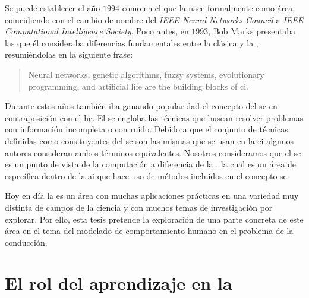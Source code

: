 Se puede establecer el año $1994$ como en el que la  nace formalmente como área, coincidiendo con el cambio de nombre del \textit{IEEE Neural Networks Council} a \textit{IEEE Computational Intelligence Society}. Poco antes, en $1993$, Bob Marks presentaba las que él consideraba diferencias fundamentales entre la  clásica y la , resumiéndolas en la siguiente frase:

\blockquote{Neural networks, genetic algorithms, fuzzy systems, evolutionary programming, and artificial life are the building blocks of \acrlong{ci}.}

Durante estos años también iba ganando popularidad el concepto del \gls{sc} en contraposición con el \gls{hc}. El \gls{sc} engloba las técnicas que buscan resolver problemas con información incompleta o con ruido. Debido a que el conjunto de técnicas definidas como consituyentes del \gls{sc} son las mismas que se usan en la \gls{ci} algunos autores consideran ambos términos equivalentes. Nosotros consideramos que el \gls{sc} es un punto de vista de la computación a diferencia de la , la cual es un área de específica dentro de la \gls{ai} que hace uso de métodos incluidos en el concepto \gls{sc}.

Hoy en día la  es un área con muchas aplicaciones prácticas en una variedad muy distinta de campos de la ciencia y con muchos temas de investigación por explorar. Por ello, esta tesis pretende la exploración de una parte concreta de este área en el tema del modelado de comportamiento humano en el problema de la conducción.

\section{El rol del aprendizaje en la }
\label{s:the-learning-role}

